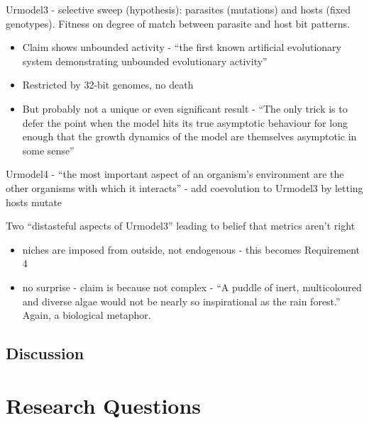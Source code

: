 Urmodel3 - selective sweep (hypothesis): parasites (mutations) and
hosts (fixed genotypes). Fitness on degree of match between parasite
and host bit patterns.


\begin{itemize}
	\item
	
	Claim shows unbounded activity - ``the first known artificial
	evolutionary system demonstrating unbounded evolutionary activity''
	
	\item
	
	Restricted by 32-bit genomes, no death
	
	\item
	
	But probably not a unique or even significant result - ``The only
	trick is to defer the point when the model hits its true asymptotic
	behaviour for long enough that the growth dynamics of the model are
	themselves asymptotic in some sense''
	
\end{itemize}


Urmodel4 - ``the most important aspect of an organism's environment
are the other organisms with which it interacts'' - add coevolution to
Urmodel3 by letting hosts mutate

Two ``distasteful aspects of Urmodel3'' leading to belief that metrics
aren't right


\begin{itemize}
	\item
	
	niches are imposed from outside, not endogenous - this becomes
	Requirement 4
	
	\item
	
	no surprise - claim is because not complex - ``A puddle of inert,
	multicoloured and diverse algae would not be nearly so inspirational
	as the rain forest.'' Again, a biological metaphor.
	
\end{itemize}



\subsection{Discussion}

\section{Research Questions}

